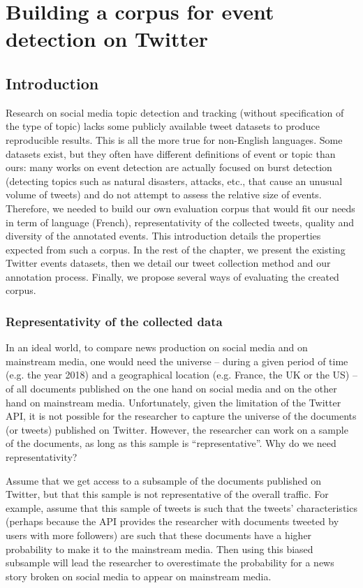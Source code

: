 \chapter{Building a corpus for event detection on Twitter}

\section{Introduction}

Research on social media topic detection and tracking (without specification
of the type of topic) lacks some publicly available tweet
datasets to produce reproducible results. This is all the
more true for non-English languages. Some datasets exist, but they often have different definitions of event or topic than ours: many works on event detection are actually focused on  burst detection (detecting topics such as natural disasters, attacks, etc., that cause an unusual volume of tweets) and do not attempt to assess the relative size of events. 
Therefore, we needed to build our own evaluation corpus that would fit our needs in term of language (French), representativity of the collected tweets, quality and diversity of the annotated events. This introduction details the properties expected from such a corpus. In the rest of the chapter, we present the existing Twitter events datasets, then we detail our tweet collection method and our annotation process. Finally, we propose several ways of evaluating the created corpus.

\subsection{Representativity of the collected data}
In an ideal world, to compare news production on social media and on mainstream media, one would need the universe – during a given period of time (e.g. the year 2018) and a geographical location (e.g. France, the UK or the US) – of all documents published on the one hand on social media and on the other hand on mainstream media. Unfortunately, given the limitation of the Twitter API, it is not possible for the researcher to capture the universe of the documents (or tweets) published on Twitter. However, the researcher can work on a sample of the documents, as long as this sample is ``representative”. Why do we need representativity?


Assume that we get access to a subsample of the documents published on Twitter, but that this sample is not representative of the overall traffic. For example, assume that this sample of tweets is such that the tweets’ characteristics (perhaps because the API provides the researcher with documents tweeted by users with more followers) are such that these documents have a higher probability to make it to the mainstream media. Then using this biased subsample will lead the researcher to overestimate the probability for a news story broken on social media to appear on mainstream media.


